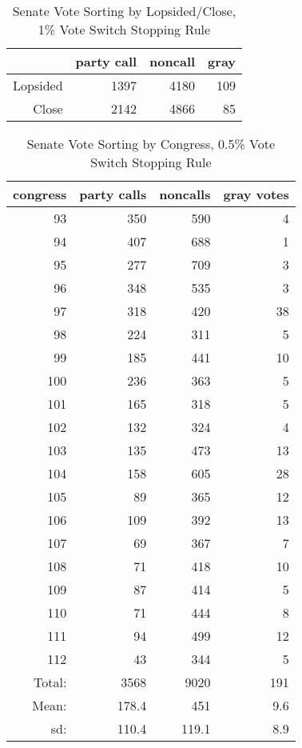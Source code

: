 \documentclass[12pt]{article}
\begin{document}
\begin{table}[ht]
	\centering
	\caption{Senate Vote Sorting by Lopsided/Close, 1\% Vote Switch Stopping Rule}
	\begin{tabular}{rrrr}
		\hline
		& party call  & noncall & gray \\
		\hline
		Lopsided & 1397 & 4180 & 109 \\
		Close & 2142 & 4866 & 85 \\
		\hline
	\end{tabular}
\end{table}


\begin{table}[ht]
	\centering
	\caption{Senate Vote Sorting by Congress, 0.5\% Vote Switch Stopping Rule}
		\begin{tabular}{rrrr}
		\hline
		congress & party calls & noncalls & gray votes \\
		\hline
		93 & 350 & 590 &   4 \\
		94 & 407 & 688 &   1 \\
		95 & 277 & 709 &   3 \\
		96 & 348 & 535 &   3 \\
		97 & 318 & 420 &  38 \\
		98 & 224 & 311 &   5 \\
		99 & 185 & 441 &  10 \\
		100 & 236 & 363 &   5 \\
		101 & 165 & 318 &   5 \\
		102 & 132 & 324 &   4 \\
		103 & 135 & 473 &  13 \\
		104 & 158 & 605 &  28 \\
		105 &  89 & 365 &  12 \\
		106 & 109 & 392 &  13 \\
		107 &  69 & 367 &   7 \\
		108 &  71 & 418 &  10 \\
		109 &  87 & 414 &   5 \\
		110 &  71 & 444 &   8 \\
		111 &  94 & 499 &  12 \\
		112 &  43 & 344 &   5 \\
		\hline
		Total: & 3568 & 9020 & 191 \\
		Mean: & 178.4 & 451 & 9.6 \\
		sd: & 110.4 & 119.1 & 8.9 \\
		\hline
	\end{tabular}
\end{table}
\end{document}
